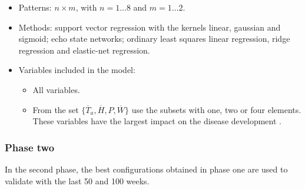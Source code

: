 \begin{itemize}
\item Patterns: $n\times{}m$, with $n=1\ldots{}8$ and $m=1\ldots{}2$.
\item Methods: support vector regression with the kernels linear,
  gaussian and sigmoid; echo state networks; ordinary least squares
  linear regression, ridge regression and elastic-net regression.
\item Variables included in the model:
\begin{itemize}
\item All variables.
\item From the set $\{ \overline{T}_{a} , \overline{H}, P ,
  \overline{W} \}$ use the subsets with one, two or four
  elements. These variables have the largest impact on the disease
  development \citep{MarinVargas1995}.
\end{itemize}

\end{itemize}

\subsubsection{Phase two} 

In the second phase, the best configurations obtained in phase one are
used to validate with the last 50 and 100 weeks.

